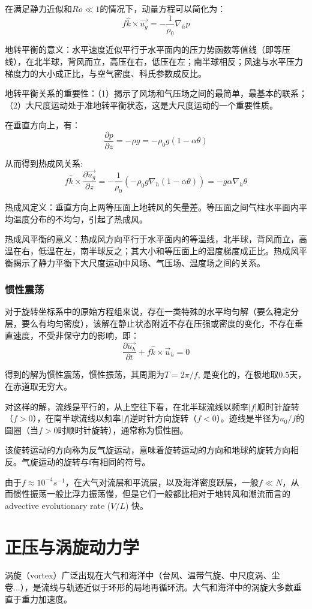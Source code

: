\documentclass{article}
\begin{document}
在满足静力近似和$Ro \ll 1$的情况下，动量方程可以简化为：
$$f\hat{k}\times\vec{u_g}=-\frac{1}{\rho_0}\nabla_hp$$

地转平衡的意义：水平速度近似平行于水平面内的压力势函数等值线（即等压线），在北半球，背风而立，高压在右，低压在左；南半球相反；风速与水平压力梯度力的大小成正比，与空气密度、科氏参数成反比。

地转平衡关系的重要性：（1）揭示了风场和气压场之间的最简单，最基本的联系；（2）大尺度运动处于准地转平衡状态，这是大尺度运动的一个重要性质。

在垂直方向上，有：
$$\frac{\partial p}{\partial z} = -\rho g = -\rho_0g(1-\alpha\theta)$$

从而得到热成风关系:
$$f\hat{k}\times\frac{\partial \vec{u_g}}{\partial z}=-\frac{1}{\rho_0}\left(-\rho_0g\nabla_h(1-\alpha\theta)\right)=-g\alpha\nabla_h\theta$$

热成风定义：垂直方向上两等压面上地转风的矢量差。等压面之间气柱水平面内平均温度分布的不均匀，引起了热成风。

热成风平衡的意义：热成风方向平行于水平面内的等温线，北半球，背风而立，高温在右，低温在左，南半球反之；其大小和等压面上的温度梯度成正比。热成风平衡揭示了静力平衡下大尺度运动中风场、气压场、温度场之间的关系。


\subsubsection{惯性震荡}
对于旋转坐标系中的原始方程组来说，存在一类特殊的水平均匀解（要么稳定分层，要么有均匀密度），该解在静止状态附近不存在压强或密度的变化，不存在垂直速度，不受非保守力的影响，即：
$$\frac{\partial \vec{u_h}}{\partial t} + f\hat{k}\times\vec{u}_h = 0$$

得到的解为惯性震荡，惯性振荡，其周期为$T=2\pi/f$, 是变化的，在极地取$0.5$天，在赤道取无穷大。

对这样的解，流线是平行的，从上空往下看，在北半球流线以频率$|f|$顺时针旋转（$f>0$），在南半球流线以频率$|f|$逆时针方向旋转（$f<0$）。迹线是半径为$u_0/f$的圆圈（当$f>0$时顺时针旋转），通常称为惯性圈。

该旋转运动的方向称为反气旋运动，意味着旋转运动的方向和地球的旋转方向相反。气旋运动的旋转与f有相同的符号。

由于$f\approx10^{-4}s^{-1}$，在大气对流层和平流层，以及海洋密度跃层，一般$f \ll N$，从而惯性振荡一般比浮力振荡慢，但是它们一般都比相对于地转风和潮流而言的 advective evolutionary rate ($V/L$) 快。


\section{正压与涡旋动力学}
涡旋（vortex）广泛出现在大气和海洋中（台风、温带气旋、中尺度涡、尘卷...），是流线与轨迹近似于环形的局地再循环流。大气和海洋中的涡旋大多数垂直于重力加速度。
\end{document}
